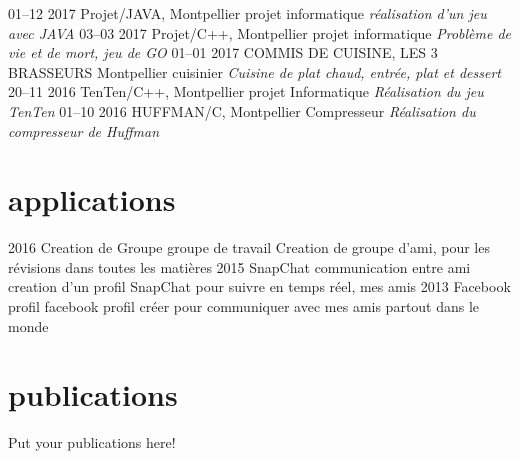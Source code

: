 \documentclass[]{friggeri-cv}
\begin{document}
\begin{entrylist}
  \entry
    {01–12 2017}
    {Projet/JAVA, Montpellier}
    {projet informatique}
    {\emph{réalisation d'un jeu avec JAVA}}
  \entry
    {03–03 2017}
    {Projet/C++, Montpellier}
    {projet informatique}
    {\emph{Problème de vie et de mort, jeu de GO}}
  \entry
    {01–01 2017}
    {COMMIS DE CUISINE, LES 3 BRASSEURS Montpellier}
    {cuisinier}
    {\emph{Cuisine de plat chaud, entrée, plat et dessert}}
  \entry
    {20–11 2016}
    {TenTen/C++, Montpellier}
    {projet Informatique}
    {\emph{Réalisation du jeu TenTen}}
   \entry
    {01–10 2016}
    {HUFFMAN/C, Montpellier}
    {Compresseur}
    {\emph{Réalisation du compresseur de Huffman}}
\end{entrylist}

\section{applications}

\begin{entrylist}
  \entry
    {2016}
    {Creation de Groupe}
    {groupe de travail }
    {Creation de groupe d'ami, pour les révisions dans toutes les matières}
  \entry
    {2015}
    {SnapChat}
    {communication entre ami}
    {creation d'un profil SnapChat pour suivre en temps réel, mes amis}
  \entry
    {2013}
    {Facebook}
    {profil facebook}
    {profil créer pour communiquer avec mes amis partout dans le monde}
\end{entrylist}

\section{publications}

Put your publications here!

% 
\end{document}
